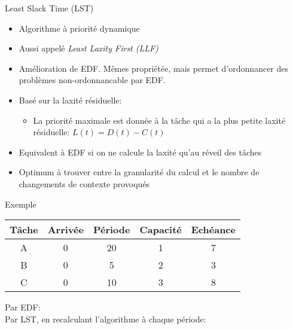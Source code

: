 \begin{frame}{Least Slack Time (LST)} 
  \begin{itemize}
  \item Algorithme à priorité dynamique
  \item Aussi appelé \emph{Least Laxity First (LLF)}
  \item   Amélioration   de  EDF.   Mêmes   propriétée,  mais   permet
    d'ordonnancer des problèmes non-ordonnancable par EDF.
  \item Basé sur la laxité résiduelle: 
    \begin{itemize}
    \item La  priorité maximale est  donnée à la  tâche qui a  la plus
      petite laxité résiduelle: $L(t) = D(t) - C(t)$
    \end{itemize}
  \item Equivalent à  EDF si on ne calcule la  laxité qu'au réveil des
    tâches
  \item Optimum à trouver entre  la granularité du calcul et le nombre
    de changements de  contexte provoqués 
  \end{itemize}
\end{frame}

\begin{frame}{Exemple}
  \begin{center}
    \begin{tabular}{ccccc}
      \hline
      Tâche & Arrivée & Période & Capacité & Echéance \\
      \hline
      A & 0 & 20 & 1 & 7\\
      B & 0 &  5 & 2 & 3\\
      C & 0 & 10 & 3 & 8\\
      \hline
    \end{tabular}
  \end{center}
  Par EDF:\\
  

  Par LST, en recalculant l'algorithme à chaque période:\\
  
\end{frame} 

